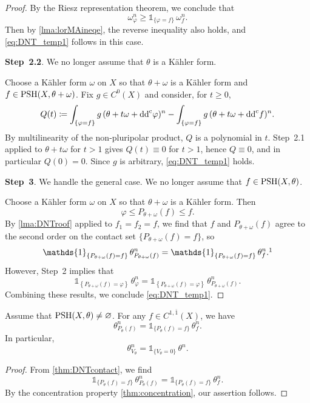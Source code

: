 \begin{proof}
By the Riesz representation theorem, we conclude that
\[
\omega_{\varphi}^n\geq \mathds{1}_{\{\varphi=f\}}\,\omega_{f}^n.
\]
Then by \cref{lma:lorMAineqe}, the reverse inequality also holds, and \eqref{eq:DNT_temp1} follows in this case.

\textbf{Step~2.2}. We no longer assume that $\theta$ is a Kähler form.

Choose a Kähler form $\omega$ on $X$ so that $\theta+\omega$ is a Kähler form and $f\in \mathrm{PSH}(X,\theta+\omega)$.
Fix $g\in C^0(X)$ and consider, for $t\geq 0$,
\[
Q(t)\coloneqq \int_{\{\varphi=f\}}g\,(\theta+t\omega+\mathrm{dd}^{\mathrm{c}}\varphi)^n - \int_{\{\varphi=f\}}g\,(\theta+t\omega+\mathrm{dd}^{\mathrm{c}} f)^n.
\]
By multilinearity of the non-pluripolar product, $Q$ is a polynomial in $t$. Step~2.1 applied to $\theta+t\omega$ for $t>1$ gives $Q(t)\equiv 0$ for $t>1$, hence $Q\equiv 0$, and in particular $Q(0)=0$. Since $g$ is arbitrary, \eqref{eq:DNT_temp1} holds.

\textbf{Step~3}. We handle the general case. We no longer assume that $f\in \mathrm{PSH}(X,\theta)$.

Choose a Kähler form $\omega$ on $X$ so that $\theta+\omega$ is a Kähler form. Then
\[
\varphi\leq P_{\theta+\omega}(f)\leq f.
\]
By \cref{lma:DNTroof} applied to $f_1=f_2=f$, we find that $f$ and $P_{\theta+\omega}(f)$ agree to the second order on the contact set $\{ P_{\theta+\omega}(f)=f \}$, so
\[
\mathds{1}_{\left\{ P_{\theta+\omega}(f)=f \right\}}\,\theta_{P_{\theta+\omega}(f)}^n=\mathds{1}_{\left\{ P_{\theta+\omega}(f)=f \right\}}\,\theta_{f}^n.\footnotemark
\]
However, Step~2 implies that
\[
\mathds{1}_{\left\{ P_{\theta+\omega}(f)=\varphi \right\}}\,\theta_{\varphi}^n=\mathds{1}_{\left\{ P_{\theta+\omega}(f)=\varphi \right\}}\,\theta_{P_{\theta+\omega}(f)}^n.
\]
Combining these results, we conclude \eqref{eq:DNT_temp1}.
\end{proof}

\begin{corollary}\label{cor:DNTenvelope1}
    Assume that $\mathrm{PSH}(X,\theta)\neq \varnothing$. For any $f\in C^{1,\overline{1}}(X)$, we have
    \[
    \theta^n_{P_\theta(f)} = \mathds{1}_{\{P_\theta(f)=f\}}\,\theta^n_f.
    \]
    In particular,
    \[
        \theta_{V_{\theta}}^n=\mathds{1}_{\{V_{\theta}=0\}}\,\theta^n.
    \]
\end{corollary}
\begin{proof}
    From \cref{thm:DNTcontact}, we find
    \[
    \mathds{1}_{\{P_\theta(f)=f\}}\,\theta^n_{P_\theta(f)}=\mathds{1}_{\{P_\theta(f)=f\}}\,\theta^n_f.
    \]
    By the concentration property \cref{thm:concentration}, our assertion follows.
\end{proof}




